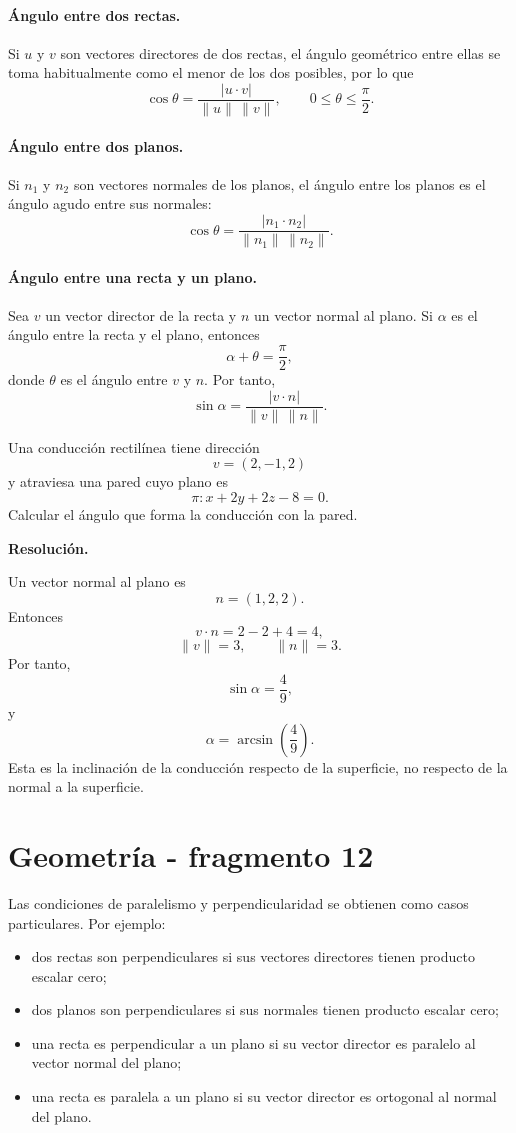 \paragraph{Ángulo entre dos rectas.}
Si $u$ y $v$ son vectores directores de dos rectas, el ángulo geométrico entre ellas se toma habitualmente como el menor de los dos posibles, por lo que
\[
\boxed{
\cos\theta
=\frac{|u\cdot v|}{\|u\|\,\|v\|},
\qquad
0\leq\theta\leq\frac\pi2.}
\]

\paragraph{Ángulo entre dos planos.}
Si $n_1$ y $n_2$ son vectores normales de los planos, el ángulo entre los planos es el ángulo agudo entre sus normales:
\[
\boxed{
\cos\theta
=\frac{|n_1\cdot n_2|}{\|n_1\|\,\|n_2\|}.}
\]

\paragraph{Ángulo entre una recta y un plano.}
Sea $v$ un vector director de la recta y $n$ un vector normal al plano. Si $\alpha$ es el ángulo entre la recta y el plano, entonces
\[
\alpha+\theta=\frac\pi2,
\]
donde $\theta$ es el ángulo entre $v$ y $n$. Por tanto,
\[
\boxed{
\sin\alpha
=\frac{|v\cdot n|}{\|v\|\,\|n\|}.}
\]

\begin{solvedexercise}
Una conducción rectilínea tiene dirección
\[
v=(2,-1,2)
\]
y atraviesa una pared cuyo plano es
\[
\pi:x+2y+2z-8=0.
\]
Calcular el ángulo que forma la conducción con la pared.

\textbf{Resolución.}\par\smallskip
Un vector normal al plano es
\[
n=(1,2,2).
\]
Entonces
\[
v\cdot n=2-2+4=4,
\]
\[
\|v\|=3,
\qquad
\|n\|=3.
\]
Por tanto,
\[
\sin\alpha=\frac49,
\]
y
\[
\boxed{\alpha=\arcsin\left(\frac49\right).}
\]
Esta es la inclinación de la conducción respecto de la superficie, no respecto de la normal a la superficie.
\end{solvedexercise}


\section{Geometría - fragmento 12}
Las condiciones de paralelismo y perpendicularidad se obtienen como casos particulares. Por ejemplo:
\begin{itemize}
\item dos rectas son perpendiculares si sus vectores directores tienen producto escalar cero;
\item dos planos son perpendiculares si sus normales tienen producto escalar cero;
\item una recta es perpendicular a un plano si su vector director es paralelo al vector normal del plano;
\item una recta es paralela a un plano si su vector director es ortogonal al normal del plano.
\end{itemize}

